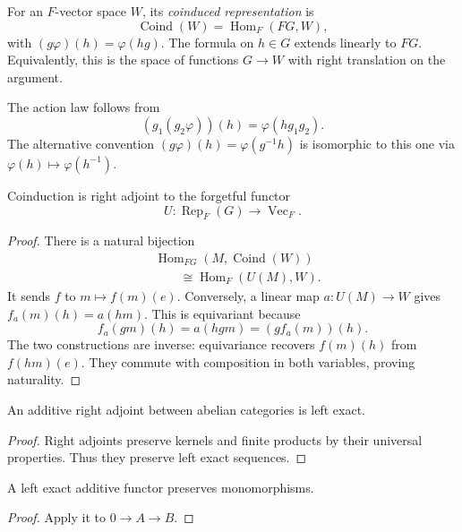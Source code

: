 \begin{definition}
\label{definition-coinduction-4-sept}
For an $F$-vector space $W$, its
\emph{coinduced representation} is
$$
\operatorname{Coind}(W)
=\operatorname{Hom}_F(FG,W),
$$
with $(g\varphi)(h)=\varphi(hg)$.
The formula on $h\in G$ extends linearly
to $FG$. Equivalently, this is the space
of functions $G\to W$ with right
translation on the argument.
\end{definition}

\noindent
The action law follows from
$$
(g_1(g_2\varphi))(h)=\varphi(hg_1g_2).
$$
The alternative convention
$(g\varphi)(h)=\varphi(g^{-1}h)$ is
isomorphic to this one via
$\varphi(h)\mapsto\varphi(h^{-1})$.

\begin{proposition}
\label{proposition-forgetful-4-sept}
Coinduction is right adjoint to the
forgetful functor
$$
U:\operatorname{Rep}_F(G)\to
\operatorname{Vec}_F.
$$
\end{proposition}

\begin{proof}
There is a natural bijection
$$
\begin{aligned}
&\operatorname{Hom}_{FG}
(M,\operatorname{Coind}(W))\\
&\qquad\cong\operatorname{Hom}_F(U(M),W).
\end{aligned}
$$
It sends $f$ to $m\mapsto f(m)(e)$.
Conversely, a linear map $a:U(M)\to W$
gives $f_a(m)(h)=a(hm)$.
This is equivariant because
$$
f_a(gm)(h)=a(hgm)=(g f_a(m))(h).
$$
The two constructions are inverse:
equivariance recovers $f(m)(h)$ from
$f(hm)(e)$. They commute with composition
in both variables, proving naturality.
\end{proof}

\begin{proposition}
\label{proposition-adjoint-exact-4-sept}
An additive right adjoint between abelian
categories is left exact.
\end{proposition}

\begin{proof}
Right adjoints preserve kernels and finite
products by their universal properties.
Thus they preserve left exact sequences.
\end{proof}

\begin{proposition}
\label{proposition-monos-4-sept}
A left exact additive functor preserves
monomorphisms.
\end{proposition}

\begin{proof}
Apply it to $0\to A\to B$.
\end{proof}

